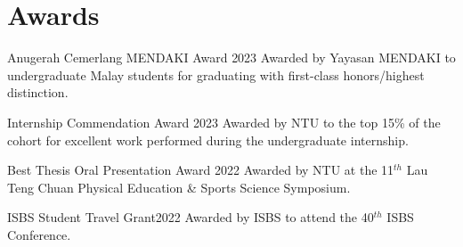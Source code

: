 \documentclass[../main.tex]{subfiles}
\begin{document}
\section{Awards}
  \vspace{2pt}
  \resumeSubHeadingListStart
    \layoutAwards
    {{Anugerah Cemerlang MENDAKI Award }\href{https://drive.google.com/file/d/1e0AXmiUYPABp2iXR39Un3uU56ksY5cPB/view?usp=sharing}{\faFilePdfO}}{2023}
    {Awarded by Yayasan MENDAKI to undergraduate Malay students for graduating with first-class honors/highest distinction.}

    \layoutAwards
    {{Internship Commendation Award }\href{https://drive.google.com/file/d/1-Zf9n5C39MHMhlUNPOGi2Gz_DRpPg0iC/view?usp=sharing}{\faFilePdfO}}{2023}
    {Awarded by NTU to the top 15\% of the cohort for excellent work performed during the undergraduate internship.}
    
    \layoutAwards
    {{Best Thesis Oral Presentation Award }\href{https://drive.google.com/file/d/1mcvcseOSgvzBLQg3tZVkGyIOOxVw6gKw/view?usp=sharing}{\faFilePdfO}}{2022}
    {Awarded by NTU at the 11$^{th}$ Lau Teng Chuan Physical Education \& Sports Science Symposium.}

    \layoutAwards
    {ISBS Student Travel Grant}{2022}
    {Awarded by ISBS to attend the 40$^{th}$ ISBS Conference.}

  \resumeSubHeadingListEnd
\end{document}

